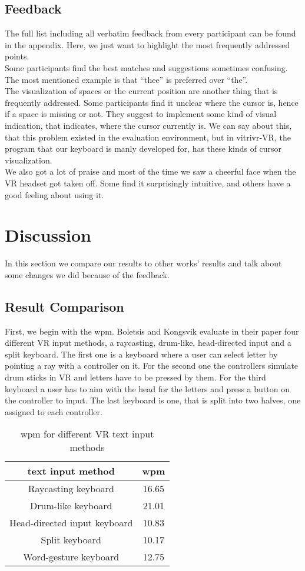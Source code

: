 \subsection{Feedback}
The full list including all verbatim feedback from every participant can be found in the appendix. Here, we just want to highlight the most frequently addressed points.\\
Some participants find the best matches and suggestions sometimes confusing. The most mentioned example is that ``thee'' is preferred over ``the''.\\
The visualization of spaces or the current position are another thing that is frequently addressed. Some participants find it unclear where the cursor is, hence if a space is missing or not. They suggest to implement some kind of visual indication, that indicates, where the cursor currently is. We can say about this, that this problem existed in the evaluation environment, but in vitrivr-VR, the program that our keyboard is manly developed for, has these kinds of cursor visualization.\\
We also got a lot of praise and most of the time we saw a cheerful face when the VR headset got taken off. Some find it surprisingly intuitive, and others have a good feeling about using it.

\section{Discussion}
In this section we compare our results to other works' results and talk about some changes we did because of the feedback.

\subsection{Result Comparison}
First, we begin with the wpm. Boletsis and Kongsvik \cite{Boletsis2019ControllerbasedTT} evaluate in their paper four different VR input methods, a raycasting, drum-like, head-directed input and a split keyboard. The first one is a keyboard where a user can select letter by pointing a ray with a controller on it. For the second one the controllers simulate drum sticks in VR and letters have to be pressed by them. For the third keyboard a user has to aim with the head for the letters and press a button on the controller to input. The last keyboard is one, that is split into two halves, one assigned to each controller. 
\begin{table}[ht!]
    \centering
    \caption{wpm for different VR text input methods}
    \begin{tabular}{cc} \toprule
        text input method&wpm\\ \midrule
        Raycasting keyboard& 16.65\\
        Drum-like keyboard& 21.01\\
        Head-directed input keyboard& 10.83\\
        Split keyboard& 10.17\\
        Word-gesture keyboard& 12.75\\
        \bottomrule
    \end{tabular}
    \label{tab:wpm_compare}
\end{table}

